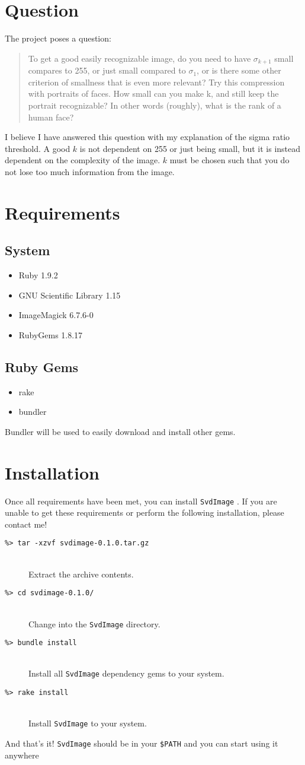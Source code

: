 \documentclass[12pt,letterpaper]{article}
\newcommand{\svdimage}{\texttt{SvdImage} }
\newcommand{\codeitem}[2]{\item[\texttt{\%> #1}] \hfill \\ #2}
\begin{document}
\section{Question}
The project poses a question:
\begin{quote}
To get a good easily recognizable image, do you need to have $\sigma_{k+1}$ small
compares to 255, or just small compared to $\sigma_1$, or is there some other criterion of smallness
that is even more relevant?
Try this compression with portraits of faces. How small can you make k, and still
keep the portrait recognizable? In other words (roughly), what is the rank of a human
face?
\end{quote}

I believe I have answered this question with my explanation of the sigma ratio
threshold. A good $k$ is not dependent on 255 or just being small, but it is
instead dependent on the complexity of the image. $k$ must be chosen such that
you do not lose too much information from the image.

\section{Requirements}
\subsection{System}
\begin{itemize}
\item Ruby 1.9.2
\item GNU Scientific Library 1.15
\item ImageMagick 6.7.6-0
\item RubyGems 1.8.17
\end{itemize}
\subsection{Ruby Gems}
\begin{itemize}
\item rake
\item bundler
\end{itemize}
Bundler will be used to easily download and install other gems.

\section{Installation}
Once all requirements have been met, you can install \svdimage. If you are
unable to get these requirements or perform the following installation, please
contact me!
\begin{description}
\codeitem{tar -xzvf svdimage-0.1.0.tar.gz}{Extract the archive contents.}
\codeitem{cd svdimage-0.1.0/}{Change into the \svdimage directory.}
\codeitem{bundle install}{Install all \svdimage dependency gems to your
system.}
\codeitem{rake install}{Install \svdimage to your system.}
\end{description}
And that's it! \svdimage should be in your \texttt{\$PATH} and you can start
using it anywhere
\end{document}
